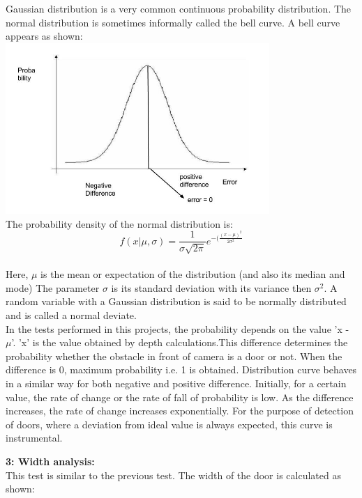 \documentclass{report}
\begin{document}
Gaussian distribution is a very common continuous probability distribution. The normal distribution is sometimes informally called the bell curve.
A bell curve appears as shown:\\

\includegraphics[width = 10cm]{Gaussian.jpg} \\
The probability density of the normal distribution is:
\begin{equation}
f(x|\mu,\sigma) = \frac{1}{\sigma\sqrt{2\pi}}e^{-(\frac{(x-\mu)^2}{2\sigma^2}}
\end{equation} \\
Here, $\mu$ is the mean or expectation of the distribution (and also its median and mode)
The parameter $\sigma$ is its standard deviation with its variance then $\sigma^2$. A random variable with a Gaussian distribution 
is said to be normally distributed and is called a normal deviate. \\
In the tests performed in this projects, the probability depends on the value 'x - $\mu$'. 'x' is the  value obtained by depth calculations.This difference determines the probability
whether the obstacle in front of camera is a door or not. When the difference is 0, maximum probability i.e. 1 is obtained. Distribution
curve behaves in a similar way for both negative and positive difference. Initially, for a certain value, the rate of change or the rate
of fall of probability is low. As the difference increases, the rate of change increases exponentially. For the purpose of detection of doors, where
a deviation from ideal value is always expected, this curve is instrumental. \\
\pagebreak

\textbf{3: Width analysis:} \\

This test is similar to the previous test. The width of the door is calculated as shown: \\
\end{document}
